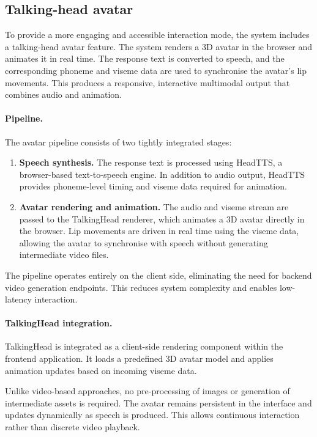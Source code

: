 \subsection{Talking-head avatar}

To provide a more engaging and accessible interaction mode, the system includes a talking-head avatar feature. The system renders a 3D avatar in the browser and animates it in real time. The response text is converted to speech, and the corresponding phoneme and viseme data are used to synchronise the avatar’s lip movements. This produces a responsive, interactive multimodal output that combines audio and animation.

\paragraph{Pipeline.}
The avatar pipeline consists of two tightly integrated stages:

\begin{enumerate}
    \item \textbf{Speech synthesis.} The response text is processed using HeadTTS, a browser-based text-to-speech engine. In addition to audio output, HeadTTS provides phoneme-level timing and viseme data required for animation.
    \item \textbf{Avatar rendering and animation.} The audio and viseme stream are passed to the TalkingHead renderer, which animates a 3D avatar directly in the browser. Lip movements are driven in real time using the viseme data, allowing the avatar to synchronise with speech without generating intermediate video files.
\end{enumerate}

The pipeline operates entirely on the client side, eliminating the need for backend video generation endpoints. This reduces system complexity and enables low-latency interaction.

\paragraph{TalkingHead integration.}
TalkingHead is integrated as a client-side rendering component within the frontend application. It loads a predefined 3D avatar model and applies animation updates based on incoming viseme data.

Unlike video-based approaches, no pre-processing of images or generation of intermediate assets is required. The avatar remains persistent in the interface and updates dynamically as speech is produced. This allows continuous interaction rather than discrete video playback.

